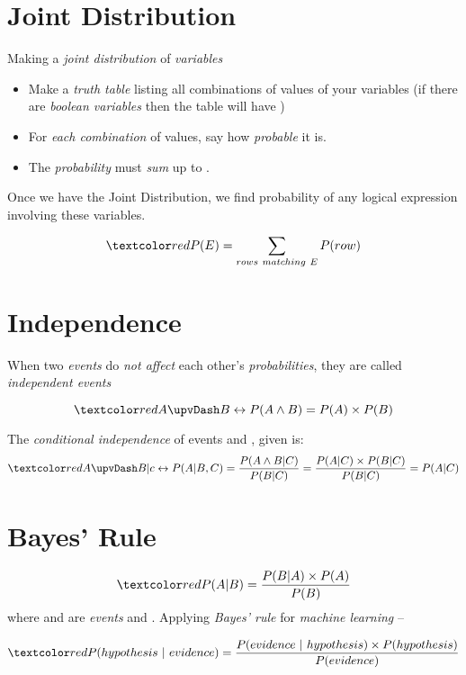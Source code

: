 \documentclass[
	title={Na\:ive Bayes Learning}
]{cs584notes}
\begin{document}
\section{Joint Distribution}\label{sec:joint-distribution}
Making a \emph{joint distribution} of  \emph{variables}
\begin{itemize}
	\item Make a \emph{truth table} listing all combinations of values of your variables (if there are  \emph{boolean variables} then the table will have )
	\item For \emph{each combination} of values, say how \emph{probable} it is.
	\item The \emph{probability} must \emph{sum} up to .
\end{itemize}

Once we have the Joint Distribution, we find probability of any logical expression involving these variables.

\[ \data{P(E) = \sum_{rows\ matching\ E}P(row)} \]

\section{Independence}\label{sec:independence}
When two \emph{events} do \emph{not affect} each other's \emph{probabilities}, they are called \emph{independent events}

\[ \data{ A \upvDash B \leftrightarrow P(A\land B) = P(A)\times P(B) } \]

The \emph{conditional independence} of events  and , given  is:
\[ \data{ A \upvDash B | c \leftrightarrow P(A|B,C) = \frac{P(A\land B|C)}{P(B|C)} = \frac{P(A|C)\times P(B|C)}{P(B|C)} = P(A|C) } \]

\section{Bayes' Rule}\label{sec:bayes'-rule}
\begin{equation}
	\data{P(A|B) = \frac{P(B|A)\times P(A)}{P(B)}}
	\label{eq:bayes-rule}
\end{equation}
where  and  are \emph{events} and .
Applying \emph{Bayes' rule} for \emph{machine learning} --

\begin{equation}
	\data{P(hypothesis\ |\ evidence) = \frac{P(evidence\ |\ hypothesis)\times P(hypothesis)}{P(evidence)}}
	\label{eq:bayes-rule-ml}
\end{equation}
\end{document}
